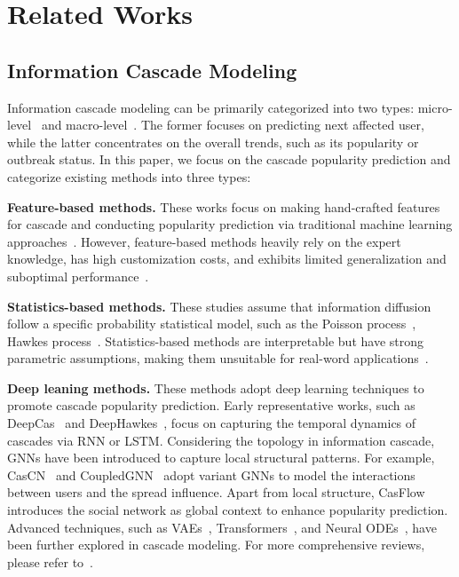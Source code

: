 \section{Related Works}
\subsection{Information Cascade Modeling}
    Information cascade modeling can be primarily categorized into two types: micro-level~\cite{qiu2018deepinf,yang2019neural} and macro-level~\cite{li2017deepcas,CasCN}.
    The former focuses on predicting next affected user, while the latter concentrates on the overall trends, such as its popularity or outbreak status.
    In this paper, we focus on the cascade popularity prediction and categorize existing methods into three types:
    
    \noindent \textbf{Feature-based methods.}
    These works focus on making hand-crafted features for cascade and conducting popularity prediction via traditional machine learning approaches~\cite{szabo2010predicting}.
    However, feature-based methods heavily rely on the expert knowledge, has high customization costs, and exhibits limited generalization and suboptimal performance~\cite{qiu2018deepinf}. 

    \noindent \textbf{Statistics-based methods.}
    These studies assume that information diffusion follow a specific probability statistical model, such as the Poisson process~\cite{iwata2013discovering}, Hawkes process~\cite{rizoiu2018sir}. 
    Statistics-based methods are interpretable but have strong parametric assumptions, making them unsuitable for real-word applications~\cite{zhou2021survey}.
    
    \noindent \textbf{Deep leaning methods.}
    These methods adopt deep learning techniques to promote cascade popularity prediction.
    Early representative works, such as DeepCas~\cite{li2017deepcas} and DeepHawkes~\cite{cao2017deephawkes}, focus on capturing the temporal dynamics of cascades via RNN or LSTM.
    Considering the topology in information cascade, GNNs have been introduced to capture local structural patterns. 
    For example, CasCN~\cite{CasCN} and CoupledGNN~\cite{cao2020popularity} adopt variant GNNs to model the interactions between users and the spread influence.
    Apart from local structure, CasFlow~\cite{casflow} introduces the social network as global context to enhance popularity prediction.
    Advanced techniques, such as VAEs~\cite{zhou2020variational,wang2021dydiff}, Transformers~\cite{Castformer,yu2022transformer}, and Neural ODEs~\cite{rubanova2019latent,cheng2024information}, have been further explored in cascade modeling.
    For more comprehensive reviews, please refer to~\cite{zhou2021survey,li2021capturing}.

